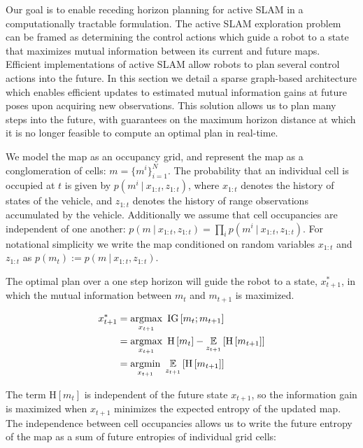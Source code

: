 \documentclass{article}
\begin{document}
\iffalse
Our goal is to enable receding horizon planning for active SLAM in a computationally tractable formulation. The active SLAM exploration problem can be framed as determining the control actions which guide a robot to a state that maximizes mutual information between its current and future maps. Efficient implementations of active SLAM allow robots to plan several control actions into the future. In this section we detail a sparse graph-based architecture which enables efficient updates to estimated mutual information gains at future poses upon acquiring new observations. This solution allows us to plan many steps into the future, with guarantees on the maximum horizon distance at which it is no longer feasible to compute an optimal plan in real-time.

We model the map as an occupancy grid, and represent the map as a conglomeration of cells: $m = \{m^{i}\}_{i=1}^{N}$. The probability that an individual cell is occupied at $t$ is given by $p\left(m^{i} \ \vert \ x_{1:t}, z_{1:t}\right)$, where $x_{1:t}$ denotes the history of states of the vehicle, and $z_{1:t}$ denotes the history of range observations accumulated by the vehicle. Additionally we assume that cell occupancies  are independent of one another: $p\left(m \ \vert \ x_{1:t}, z_{1:t}\right) = \prod_{i} p\left(m^{i} \ \vert \ x_{1:t}, z_{1:t}\right)$. For notational simplicity we write the map conditioned on random variables $x_{1:t}$ and $z_{1:t}$ as $p\left(m_{t}\right) := p\left(m \ \vert \ x_{1:t}, z_{1:t}\right)$.

The optimal plan over a one step horizon will guide the robot to a state, $x_{t+1}^{*}$, in which the mutual information between $m_{t}$ and $m_{t+1}$ is maximized.

\begin{align} \begin{split}
  x_{t+1}^{*}
  &=
  \argmax_{x_{t+1}}
  \
  \text{IG}\left[
    m_{t}
    ;
    m_{t+1}
  \right]
  \\
  &=
  \argmax_{x_{t+1}}
  \
  \text{H}\left[
    m_{t}
  \right]
  -
  \expect_{z_{t+1}}\left[
    \text{H}\left[
      m_{t+1}
    \right]
  \right]
  \\
  &=
  \argmin_{x_{t+1}}
  \
  \expect_{z_{t+1}}\left[
    \text{H}\left[
      m_{t+1}
    \right]
  \right]
\end{split} \end{align}

The term $\text{H}\left[m_{t}\right]$ is independent of the future state $x_{t+1}$, so the information gain is maximized when $x_{t+1}$ minimizes the expected entropy of the updated map. The independence between cell occupancies allows us to write the future entropy of the map as a sum of future entropies of individual grid cells:
\end{document}
